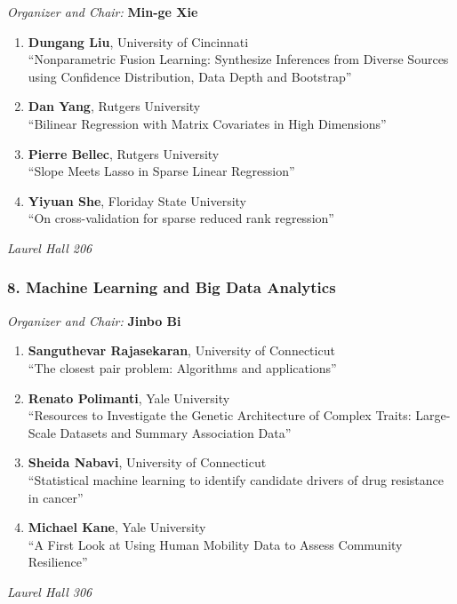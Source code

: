 \emph{Organizer and Chair:} \textbf{Min-ge Xie}

\begin{enumerate}
\item \textbf{Dungang Liu}, University of Cincinnati \\
``Nonparametric Fusion Learning: Synthesize Inferences from Diverse Sources using Confidence Distribution, Data Depth and Bootstrap''
\item \textbf{Dan Yang}, Rutgers University \\
``Bilinear Regression with Matrix Covariates in High Dimensions''
\item \textbf{Pierre Bellec}, Rutgers University \\
``Slope Meets Lasso in Sparse Linear Regression''
\item \textbf{Yiyuan She}, Floriday State University \\
``On cross-validation for sparse reduced rank regression''
\end{enumerate}

\emph{Laurel Hall 206} \\[.5em]

\subsubsection*{8. Machine Learning and Big Data Analytics}

\emph{Organizer and Chair:} \textbf{Jinbo Bi}

\begin{enumerate}
\item \textbf{Sanguthevar Rajasekaran}, University of Connecticut \\
``The closest pair problem: Algorithms and applications''
\item \textbf{Renato Polimanti}, Yale University \\
``Resources to Investigate the Genetic Architecture of Complex Traits: Large-Scale Datasets and Summary Association Data''
\item \textbf{Sheida Nabavi}, University of Connecticut \\
``Statistical machine learning to identify candidate drivers of drug resistance in cancer''
\item \textbf{Michael Kane}, Yale University \\
``A First Look at Using Human Mobility Data to Assess Community Resilience''
\end{enumerate}

\emph{Laurel Hall 306} \\[.5em]

